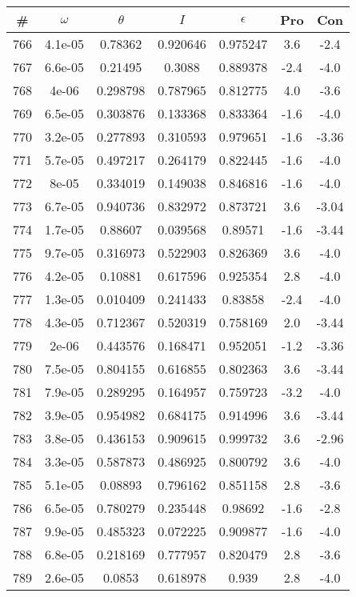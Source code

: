 \begin{table}
\begin{tabular}{c|c|c|c|c|c|c}
\# & $\omega$ & $\theta$ & $I$ & $\epsilon$ & Pro & Con\\
\hline
766 & 4.1e-05 & 0.78362 & 0.920646 & 0.975247 & 3.6 & -2.4\\
767 & 6.6e-05 & 0.21495 & 0.3088 & 0.889378 & -2.4 & -4.0\\
768 & 4e-06 & 0.298798 & 0.787965 & 0.812775 & 4.0 & -3.6\\
769 & 6.5e-05 & 0.303876 & 0.133368 & 0.833364 & -1.6 & -4.0\\
770 & 3.2e-05 & 0.277893 & 0.310593 & 0.979651 & -1.6 & -3.36\\
771 & 5.7e-05 & 0.497217 & 0.264179 & 0.822445 & -1.6 & -4.0\\
772 & 8e-05 & 0.334019 & 0.149038 & 0.846816 & -1.6 & -4.0\\
773 & 6.7e-05 & 0.940736 & 0.832972 & 0.873721 & 3.6 & -3.04\\
774 & 1.7e-05 & 0.88607 & 0.039568 & 0.89571 & -1.6 & -3.44\\
775 & 9.7e-05 & 0.316973 & 0.522903 & 0.826369 & 3.6 & -4.0\\
776 & 4.2e-05 & 0.10881 & 0.617596 & 0.925354 & 2.8 & -4.0\\
777 & 1.3e-05 & 0.010409 & 0.241433 & 0.83858 & -2.4 & -4.0\\
778 & 4.3e-05 & 0.712367 & 0.520319 & 0.758169 & 2.0 & -3.44\\
779 & 2e-06 & 0.443576 & 0.168471 & 0.952051 & -1.2 & -3.36\\
780 & 7.5e-05 & 0.804155 & 0.616855 & 0.802363 & 3.6 & -3.44\\
781 & 7.9e-05 & 0.289295 & 0.164957 & 0.759723 & -3.2 & -4.0\\
782 & 3.9e-05 & 0.954982 & 0.684175 & 0.914996 & 3.6 & -3.44\\
783 & 3.8e-05 & 0.436153 & 0.909615 & 0.999732 & 3.6 & -2.96\\
784 & 3.3e-05 & 0.587873 & 0.486925 & 0.800792 & 3.6 & -4.0\\
785 & 5.1e-05 & 0.08893 & 0.796162 & 0.851158 & 2.8 & -3.6\\
786 & 6.5e-05 & 0.780279 & 0.235448 & 0.98692 & -1.6 & -2.8\\
787 & 9.9e-05 & 0.485323 & 0.072225 & 0.909877 & -1.6 & -4.0\\
788 & 6.8e-05 & 0.218169 & 0.777957 & 0.820479 & 2.8 & -3.6\\
789 & 2.6e-05 & 0.0853 & 0.618978 & 0.939 & 2.8 & -4.0\\

\end{tabular}
\end{table}
